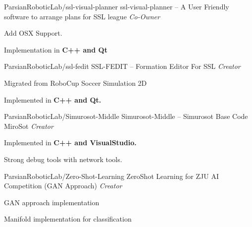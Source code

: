 
\begin{cventries}
  \cventry
    {ParsianRoboticLab/ssl-visual-planner} %
    {ssl-visual-planner -- A User Friendly software to arrange plans for SSL league} %
    {\textit{Co-Owner}} %
    {} %
    {
      \begin{cvitems} %
        \item {Add OSX Support.}
        \item {Implementation in \textbf{C++ and Qt}}
      \end{cvitems}
    }
        \newline

  \cventry
    {ParsianRoboticLab/ssl-fedit} %
    {SSL-FEDIT -- Formation Editor For SSL} %
    {\textit{Creator}} %
    {} %
    {
      \begin{cvitems} %
        \item {Migrated from RoboCup Soccer Simulation 2D}
        \item {Implemented in \textbf{C++ and Qt.}}
      \end{cvitems}
    }

  \cventry
    {ParsianRoboticLab/Simurosot-Middle} %
    {Simurosot-Middle -- Simurosot Base Code MiroSot} %
    {\textit{Creator}} %
    {} %
    {
      \begin{cvitems} %
        \item {Implemented in \textbf{C++ and VisualStudio.}}
        \item {Strong debug tools with network tools.}
      \end{cvitems}
    }
    
  \cventry
    {ParsianRoboticLab/Zero-Shot-Learning} %
    {ZeroShot Learning for ZJU AI Competition (GAN Approach)} %
    {\textit{Creator}} %
    {} %
    {
      \begin{cvitems} %
        \item {GAN approach implementation}
        \item {Manifold implementation for classification}
      \end{cvitems}
    }

\end{cventries}

